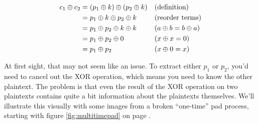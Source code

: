 \documentclass[11pt,ebook,table,dvipsnames]{memoir}
\begin{document}
\begin{align*}
c_1 \oplus c_2
&= (p_1 \oplus k) \oplus (p_2 \oplus k) && (\text{definition})\\
&= p_1 \oplus k \oplus p_2 \oplus k && (\text{reorder terms})\\
&= p_1 \oplus p_2 \oplus k \oplus k && (a \oplus b = b \oplus a) \\
&= p_1 \oplus p_2 \oplus 0 && (x \oplus x = 0) \\
&= p_1 \oplus p_2 && (x \oplus 0 = x)
\end{align*}

At first sight, that may not seem like an issue. To extract either
$p_1$ or $p_2$, you'd need to cancel out the XOR operation, which
means you need to know the other plaintext. The problem is that even
the result of the XOR operation on two plaintexts contains quite a bit
information about the plaintexts themselves. We'll illustrate this
visually with some images from a broken \enquote{one-time} pad process,
starting with figure \ref{fig:multitimepad} on page
\pageref{fig:multitimepad}.
\end{document}
